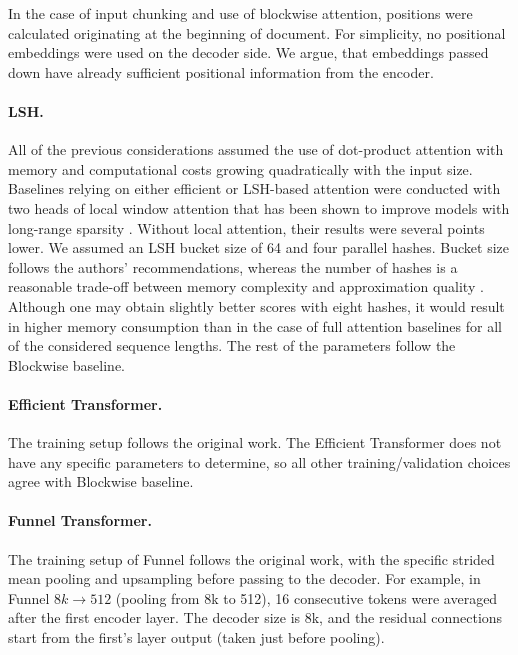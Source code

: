 \documentclass{article}
\begin{document}
{In the case of input chunking and use of blockwise attention, positions were calculated originating at the beginning of document. For simplicity, no positional embeddings were used on the decoder side. We argue, that embeddings passed down have already sufficient positional information from the encoder. 
\paragraph{LSH.}
All of the previous considerations assumed the use of dot-product attention with memory and computational costs growing quadratically with the input size.
Baselines relying on either efficient or LSH-based attention were conducted with two heads of local window attention that has been shown to improve models with long-range sparsity \citep{rae-razavi-2020-transformers}. Without local attention, their results were several points lower. We assumed an LSH bucket size of 64 and four parallel hashes. Bucket size follows the authors' recommendations, whereas the number of hashes is a reasonable trade-off between memory complexity and approximation quality \citep{Kitaev2020ReformerTE}. Although one may obtain slightly better scores with eight hashes, it would result in higher memory consumption than in the case of full attention baselines for all of the considered sequence lengths. The rest of the parameters follow the Blockwise baseline.

\paragraph{Efficient Transformer.}
The training setup follows the original work. The Efficient Transformer does not have any specific parameters to determine, so all other training/validation choices agree with Blockwise baseline. 

\paragraph{Funnel Transformer.}
The training setup of Funnel follows the original work, with the specific strided mean pooling and upsampling before passing to the decoder. For example, in Funnel $8k \rightarrow 512$ (pooling from 8k to 512), 16 consecutive tokens were averaged after the first encoder layer. The decoder size is 8k, and the residual connections start from the first's layer output (taken just before pooling).

}
\end{document}
